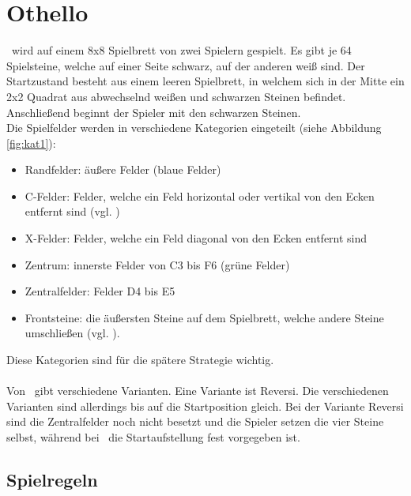 \chapter{Othello}
\label{othello-chapter}
\ot\ wird auf einem 8x8 Spielbrett von zwei Spielern gespielt. Es gibt je 64 Spielsteine, welche auf einer Seite schwarz, auf der anderen weiß sind. Der Startzustand besteht aus einem leeren Spielbrett, in welchem sich in der Mitte ein 2x2 Quadrat aus abwechselnd weißen und schwarzen Steinen befindet. Anschließend beginnt der Spieler mit den schwarzen Steinen.
\\Die Spielfelder werden in verschiedene Kategorien eingeteilt (siehe Abbildung
 \ref{fig:kat1}):
\begin{itemize}
\item Randfelder: äußere Felder (blaue Felder) \cite{wikibooks}
\item C-Felder: Felder, welche ein Feld horizontal oder vertikal von den Ecken entfernt sind (vgl. \cite{Berg})
\item X-Felder: Felder, welche ein Feld diagonal von den Ecken entfernt sind \cite{wikibooks}
\item Zentrum: innerste Felder von C3 bis F6 (grüne Felder) \cite{wikibooks}
\item Zentralfelder: Felder D4 bis E5 \cite{wikibooks}
\item Frontsteine: die äußersten Steine auf dem Spielbrett, welche andere Steine umschließen (vgl. \cite{Ortiz.}).
\end{itemize}
Diese Kategorien sind für die spätere Strategie wichtig.
\\
\\Von \ot\ gibt verschiedene Varianten. Eine Variante ist Reversi.
Die verschiedenen Varianten sind allerdings bis auf die Startposition gleich. Bei der Variante Reversi sind die Zentralfelder noch nicht besetzt und die Spieler setzen die vier Steine selbst, während bei \ot\ die Startaufstellung fest vorgegeben ist.

\section{Spielregeln}

